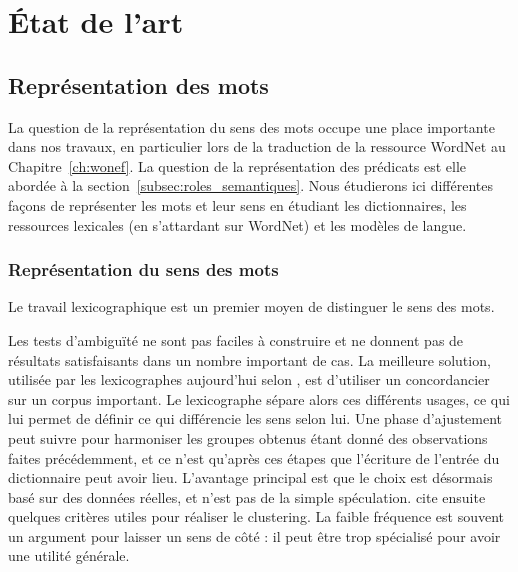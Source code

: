 \chapter{État de l'art} 
\label{ch:etatdelart} 

\section{Représentation des mots}

La question de la représentation du sens des mots occupe une place importante
dans nos travaux, en particulier lors de la traduction de la ressource WordNet
au Chapitre~\ref{ch:wonef}. La question de la représentation des prédicats est
elle abordée à la section~\ref{subsec:roles_semantiques}. Nous étudierons ici
différentes façons de représenter les mots et leur sens en étudiant les
dictionnaires, les ressources lexicales (en s'attardant sur WordNet) et les
modèles de langue.


\subsection{Représentation du sens des mots}

Le travail lexicographique est un premier moyen de distinguer le sens des mots.

Les tests d'ambiguïté ne sont pas faciles à construire et ne donnent
pas de résultats satisfaisants dans un nombre important de cas. La meilleure
solution, utilisée par les lexicographes aujourd'hui selon
\cite{kilgarriff1997don}, est d'utiliser un concordancier sur un corpus
important. Le lexicographe sépare alors ces différents usages, ce qui lui
permet de définir ce qui différencie les sens selon lui. Une phase d'ajustement
peut suivre pour harmoniser les groupes obtenus étant donné des observations
faites précédemment, et ce n'est qu'après ces étapes que l'écriture de l'entrée
du dictionnaire peut avoir lieu. L'avantage principal est que le choix est
désormais basé sur des données réelles, et n'est pas de la simple spéculation.
\cite{kilgarriff1997don} cite ensuite quelques critères utiles pour réaliser le
clustering. La faible fréquence est souvent un argument pour laisser un sens de
côté : il peut être trop spécialisé pour avoir une utilité générale.

